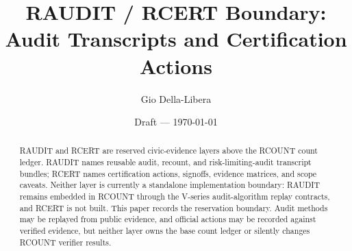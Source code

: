 \documentclass[12pt]{article}
\title{RAUDIT / RCERT Boundary: Audit Transcripts and Certification Actions}
\author{Gio Della-Libera}
\date{Draft --- \today}
\begin{document}
\maketitle

\begin{abstract}
RAUDIT and RCERT are reserved civic-evidence layers above the RCOUNT count
ledger. RAUDIT names reusable audit, recount, and risk-limiting-audit transcript
bundles; RCERT names certification actions, signoffs, evidence matrices, and
scope caveats. Neither layer is currently a standalone implementation boundary:
RAUDIT remains embedded in RCOUNT through the V-series audit-algorithm replay
contracts, and RCERT is not built. This paper records the reservation boundary.
Audit methods may be replayed from public evidence, and official actions may be
recorded against verified evidence, but neither layer owns the base count ledger
or silently changes RCOUNT verifier results.
\end{abstract}






\nocite{rcount-overview-2026,civic-evidence-boundaries-2026}


\end{document}
